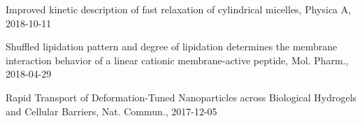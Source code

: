 
\begin{cventries}
  \vspace{-10pt}
  \cventry
    {} %
    {} %
    {} %
    {} %
    {
      \begin{cvitems} %
        \item {Improved kinetic description of fast relaxation of cylindrical micelles, Physica A, 2018-10-11}
        \item {Shuffled lipidation pattern and degree of lipidation determines the membrane interaction behavior of a linear cationic membrane-active peptide, Mol. Pharm., 2018-04-29}
        \item {Rapid Transport of Deformation-Tuned Nanoparticles across Biological Hydrogels and Cellular Barriers, Nat. Commun., 2017-12-05}
      \end{cvitems}
    }
    
\end{cventries}